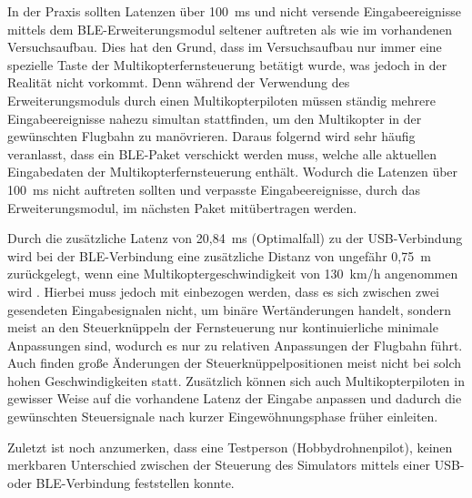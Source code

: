 In der Praxis sollten Latenzen über 100~ms und nicht versende Eingabeereignisse mittels dem \ac{BLE}-Erweiterungsmodul seltener auftreten als wie im vorhandenen Versuchsaufbau. Dies hat den Grund, dass im Versuchsaufbau nur immer eine spezielle Taste der Multikopterfernsteuerung betätigt wurde, was jedoch in der Realität nicht vorkommt. Denn während der Verwendung des Erweiterungsmoduls durch einen Multikopterpiloten müssen ständig mehrere Eingabeereignisse nahezu simultan stattfinden, um den Multikopter in der gewünschten Flugbahn zu manövrieren. Daraus folgernd wird sehr häufig veranlasst, dass ein \ac{BLE}-Paket verschickt werden muss, welche alle aktuellen Eingabedaten der Multikopterfernsteuerung enthält. Wodurch die Latenzen über 100~ms nicht auftreten sollten und verpasste Eingabeereignisse, durch das Erweiterungsmodul, im nächsten Paket mitübertragen werden.

Durch die zusätzliche Latenz von 20,84~ms (Optimalfall) zu der USB-Verbindung wird bei der \ac{BLE}-Verbindung eine zusätzliche Distanz von ungefähr 0,75~m zurückgelegt, wenn eine Multikoptergeschwindigkeit von 130~km/h angenommen wird \cites{droneSpeed1}{droneSpeed2}{droneSpeed3}. Hierbei muss jedoch mit einbezogen werden, dass es sich zwischen zwei gesendeten Eingabesignalen nicht, um binäre Wertänderungen handelt, sondern meist an den Steuerknüppeln der Fernsteuerung nur kontinuierliche minimale Anpassungen sind, wodurch es nur zu relativen Anpassungen der Flugbahn führt. Auch finden große Änderungen der Steuerknüppelpositionen meist nicht bei solch hohen Geschwindigkeiten statt. Zusätzlich können sich auch Multikopterpiloten in gewisser Weise auf die vorhandene Latenz der Eingabe anpassen und dadurch die gewünschten Steuersignale nach kurzer Eingewöhnungsphase früher einleiten.

Zuletzt ist noch anzumerken, dass eine Testperson (Hobbydrohnenpilot), keinen merkbaren Unterschied zwischen der Steuerung des Simulators mittels einer USB- oder \ac{BLE}-Verbindung feststellen konnte.
